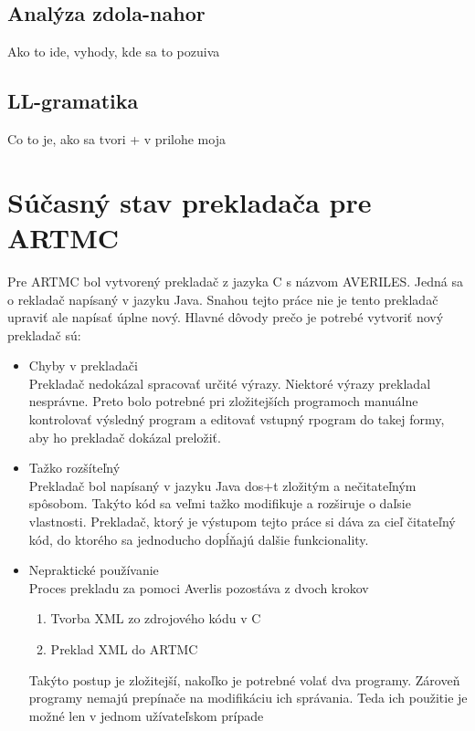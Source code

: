 \section{Analýza zdola-nahor}
Ako to ide, vyhody, kde sa to pozuiva

\section{LL-gramatika}
Co to je, ako sa tvori + v prilohe moja

\chapter{Súčasný stav prekladača pre ARTMC}
Pre ARTMC bol vytvorený prekladač z jazyka C s názvom AVERILES. Jedná sa o
rekladač napísaný v jazyku Java. Snahou tejto práce nie je tento prekladač
upraviť ale napísať úplne nový. Hlavné dôvody prečo je potrebé vytvoriť nový
prekladač sú:
\begin{itemize}
    \item Chyby v prekladači\\
        Prekladač nedokázal spracovať určité výrazy. Niektoré výrazy prekladal nesprávne.
        Preto bolo potrebné pri zložitejších programoch manuálne kontrolovať výsledný
        program a editovať vstupný rpogram do takej formy, aby ho prekladač dokázal
        preložiť.
    \item Tažko rozšíteľný\\
        Prekladač bol napísaný v jazyku Java dos+t zložitým a nečitateľným spôsobom. Takýto
        kód sa veľmi tažko modifikuje a rozširuje o daľsie vlastnosti. Prekladač,
        ktorý je výstupom tejto práce si dáva za cieľ čitateľný kód, do ktorého
        sa jednoducho dopĺňajú dalšie funkcionality.
    \item Nepraktické používanie\\
        Proces prekladu za pomoci Averlis pozostáva z dvoch krokov
        \begin{enumerate}
            \item Tvorba XML zo zdrojového kódu v C
            \item Preklad XML do ARTMC
        \end{enumerate}
        Takýto postup je zložitejší, nakoľko je potrebné volať dva programy.
        Zároveň programy nemajú prepínače na modifikáciu ich správania. Teda
        ich použitie je možné len v jednom užívateľskom prípade
\end{itemize}


